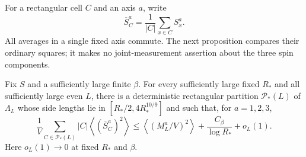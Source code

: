 For a rectangular cell $C$ and an axis $a$, write
\[
 \overline S_C^a=\frac1{|C|}\sum_{x\in C}S_x^a.
\]
All averages in a single fixed axis commute.  The next proposition
compares their ordinary squares; it makes no joint-measurement assertion
about the three spin components.

\begin{proposition}\label{prop:scale-comparison}
Fix $S$ and a sufficiently large finite $\beta$.  For every sufficiently
large fixed $R_*$ and all sufficiently large even $L$, there is a
deterministic rectangular partition $\mathcal P_*(L)$ of $\Lambda_L$
whose side lengths lie in $[R_*/2,4R_*^{10/9}]$ and such that, for
$a=1,2,3$,
\begin{equation}\label{eq:spatial-comparison}
 \frac1V\sum_{C\in\mathcal P_*(L)}|C|
       \left\langle(\overline S_C^a)^2\right\rangle
 \le
       \left\langle(M_L^a/V)^2\right\rangle
       +\frac{C_\beta}{\log R_*}+o_L(1).
\end{equation}
Here $o_L(1)\to0$ at fixed $R_*$ and $\beta$.
\end{proposition}

